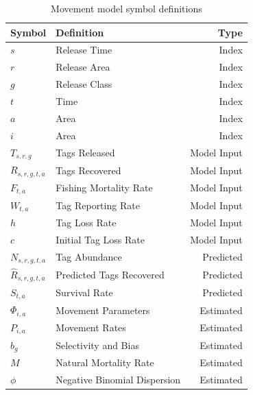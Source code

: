\documentclass{article}
\begin{document}
\begin{table}[ht]
  \centering
  \caption{Movement model symbol definitions}
  \renewcommand\arraystretch{1.2}
  \label{tab:symbol-definitions-1}
  \begin{tabular}{l l r}
    \toprule
    \textbf{Symbol} & \textbf{Definition} & \textbf{Type} \\
    \midrule
    $s$ & Release Time & Index \\
    $r$ & Release Area & Index \\
    $g$ & Release Class & Index \\
    $t$ & Time & Index \\
    $a$ & Area & Index \\
    $i$ & Area & Index \\
    $T_{s,r,g}$ & Tags Released & Model Input \\
    $R_{s,r,g,t,a}$ & Tags Recovered & Model Input \\
    $F_{t,a}$ & Fishing Mortality Rate & Model Input \\
    $W_{t,a}$ & Tag Reporting Rate & Model Input  \\
    $h$ & Tag Loss Rate & Model Input \\
    $c$ & Initial Tag Loss Rate & Model Input  \\
    $N_{s,r,g,t,a}$ & Tag Abundance & Predicted \\
    $\hat{R}_{s,r,g,t,a}$ & Predicted Tags Recovered & Predicted \\
    $S_{t,a}$ & Survival Rate & Predicted \\
    $\Phi_{i,a}$ & Movement Parameters & Estimated \\
    $P_{i,a}$ & Movement Rates & Estimated  \\
    $b_{g}$ & Selectivity and Bias & Estimated  \\
    $M$ & Natural Mortality Rate & Estimated  \\
    $\phi$ & Negative Binomial Dispersion & Estimated \\
    \bottomrule
  \end{tabular}
\end{table}

\end{document}
